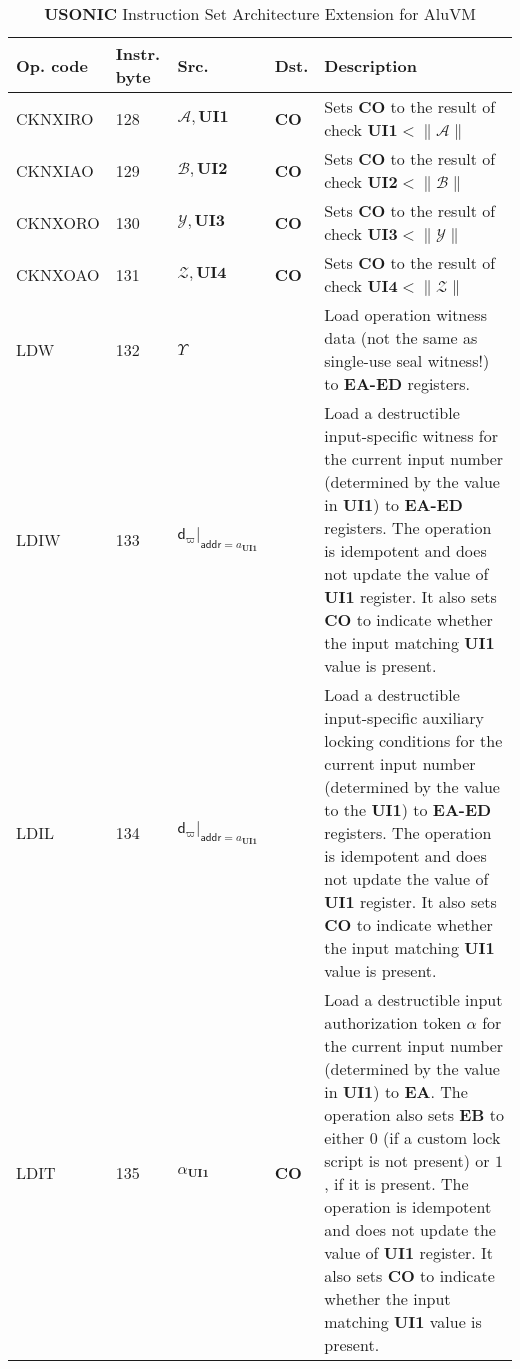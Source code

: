 \documentclass[9pt,oneside]{amsart}
\begin{document}
\begin{table}[h]
\centering
\caption{\textbf{USONIC} Instruction Set Architecture Extension for AluVM}\label{tab:usonic}
\begin{tabular}{l p{1cm} l p{1.5cm} p{9.3cm}}
\toprule
Op. code & Instr. byte & Src. & Dst. & Description \\
\midrule
CKNXIRO	&128	&$\mathcal{A}, \mathbf{UI1}$	&\textbf{CO}	&Sets \textbf{CO} to the result of check $\mathbf{UI1} < \| \mathcal{A} \|$ \\ \midrule
CKNXIAO	&129	&$\mathcal{B}, \mathbf{UI2}$	&\textbf{CO}	&Sets \textbf{CO} to the result of check $\mathbf{UI2} < \| \mathcal{B} \|$ \\ \midrule
CKNXORO	&130	&$\mathcal{Y}, \mathbf{UI3}$	&\textbf{CO}	&Sets \textbf{CO} to the result of check $\mathbf{UI3} < \| \mathcal{Y} \|$ \\ \midrule
CKNXOAO	&131	&$\mathcal{Z}, \mathbf{UI4}$	&\textbf{CO}	&Sets \textbf{CO} to the result of check $\mathbf{UI4} < \| \mathcal{Z} \|$ \\ \midrule
LDW	    &132	&$\Upsilon$	                    &              	&Load operation witness data (not the same as single-use seal witness!) to \textbf{EA-ED} registers. \\ \midrule
LDIW	&133	&$\mathsf{d}_\varpi|_{\mathsf{addr} = a_\mathbf{UI1}}$	&	&Load a destructible input-specific witness for the current input number (determined by the value in \textbf{UI1}) to \textbf{EA-ED} registers.
The operation is idempotent and does not update the value of \textbf{UI1} register. It also sets \textbf{CO} to indicate whether the input matching \textbf{UI1} value is present. \\ \midrule
LDIL	&134	&$\mathsf{d}_\varpi|_{\mathsf{addr} = a_\mathbf{UI1}}$	&	&Load a destructible input-specific auxiliary locking conditions for the current input number (determined by the value to the \textbf{UI1}) to \textbf{EA-ED} registers.
The operation is idempotent and does not update the value of \textbf{UI1} register. It also sets \textbf{CO} to indicate whether the input matching \textbf{UI1} value is present. \\ \midrule
LDIT	&135	&$\alpha_\mathbf{UI1}$	        &\textbf{CO}	&Load a destructible input authorization token $\alpha$ for the current input number (determined by the value in \textbf{UI1}) to \textbf{EA}. The operation also sets \textbf{EB} to either $0$ (if a custom lock script is not present) or $1$, if it is present.
The operation is idempotent and does not update the value of \textbf{UI1} register. It also sets \textbf{CO} to indicate whether the input matching \textbf{UI1} value is present. \\ \midrule

\end{tabular}
\end{table}
\end{document}
